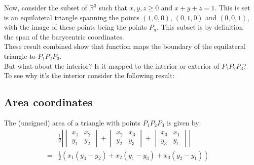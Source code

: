 Now,
consider the subset of $\mathbb{R}^3$ such that $x,y,z\geq0$ and $x+y+z=1$.
This is set is an equilateral triangle spanning the points $(1,0,0),\,(0,1,0)$ and $(0,0,1)$,
with the image of these points being the points $P_n$.
This subset is by definition the span of the barycentric coordinates.
\\

These result combined show that function maps the boundary of the equilateral triangle to $P_1P_2P_3$.
\\

But what about the interior?
Is it mapped to the interior or exterior of $P_1P_2P_3$?
To see why it's the interior consider the following result:

\subsection{Area coordinates}
\begin{center}
\end{center}
The (unsigned) area of a triangle with points $P_1P_2P_3$ is given by:
\begin{equation*}
\begin{aligned}
	&\frac{1}{2}\left|\begin{vmatrix} x_1&x_2\\y_1&y_2\end{vmatrix} + \begin{vmatrix} x_2&x_3\\y_2&y_3 \end{vmatrix} + \begin{vmatrix} x_3&x_1\\y_3&y_1\end{vmatrix}\right|\\
	=&\frac{1}{2}(x_1(y_3-y_2)+x_2(y_1-y_3)+x_3(y_2-y_1))\\
\end{aligned}
\end{equation*}
